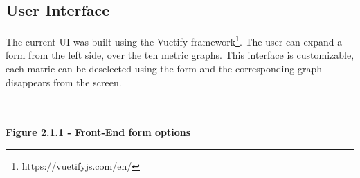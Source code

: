 \documentclass[12pt,hidelinks]{article}
\begin{document}
\subsection{User Interface}

The current UI was built using the Vuetify framework\footnote{https://vuetifyjs.com/en/}. The user can expand a form from the left side, over the ten metric graphs. 
This interface is customizable, each matric can be deselected using the form and the corresponding graph disappears from the screen. \\
\\  
\begin{center}
 \\
\textbf{Figure 2.1.1 - Front-End form options}
\end{center}
\end{document}
